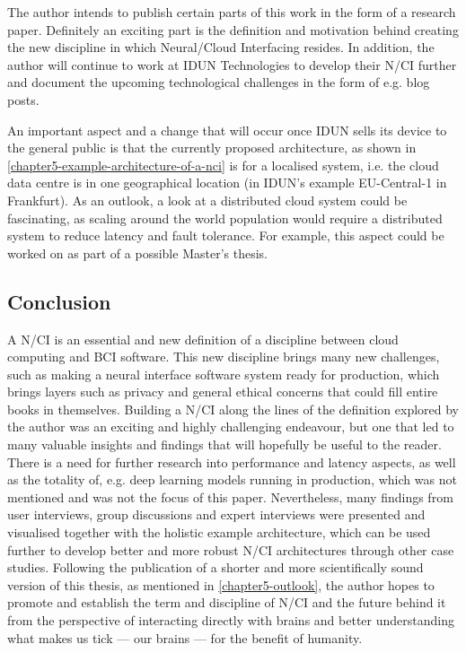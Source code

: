 The author intends to publish certain parts of this work in the form of a research paper. Definitely an exciting part is the definition and motivation behind creating the new discipline in which Neural/Cloud Interfacing resides. In addition, the author will continue to work at IDUN Technologies to develop their N/CI further and document the upcoming technological challenges in the form of e.g. blog posts.

An important aspect and a change that will occur once IDUN sells its device to the general public is that the currently proposed architecture, as shown in \autoref{chapter5-example-architecture-of-a-nci} is for a localised system, i.e. the cloud data centre is in one geographical location (in IDUN's example EU-Central-1 in Frankfurt). As an outlook, a look at a distributed cloud system could be fascinating, as scaling around the world population would require a distributed system to reduce latency and fault tolerance. For example, this aspect could be worked on as part of a possible Master's thesis.

\subsection{Conclusion}
\label{chapter5-conclusion}

A N/CI is an essential and new definition of a discipline between cloud computing and BCI software. This new discipline brings many new challenges, such as making a neural interface software system ready for production, which brings layers such as privacy and general ethical concerns that could fill entire books in themselves. Building a N/CI along the lines of the definition explored by the author was an exciting and highly challenging endeavour, but one that led to many valuable insights and findings that will hopefully be useful to the reader. There is a need for further research into performance and latency aspects, as well as the totality of, e.g. deep learning models running in production, which was not mentioned and was not the focus of this paper. Nevertheless, many findings from user interviews, group discussions and expert interviews were presented and visualised together with the holistic example architecture, which can be used further to develop better and more robust N/CI architectures through other case studies. Following the publication of a shorter and more scientifically sound version of this thesis, as mentioned in \autoref{chapter5-outlook}, the author hopes to promote and establish the term and discipline of N/CI and the future behind it from the perspective of interacting directly with brains and better understanding what makes us tick — our brains — for the benefit of humanity.

